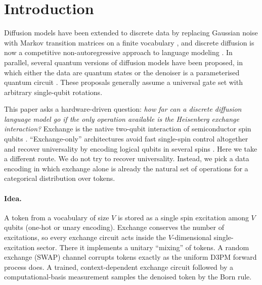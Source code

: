 \section{Introduction}
Diffusion models \citep{sohl2015deep,ho2020denoising} have been extended to discrete data by
replacing Gaussian noise with Markov transition matrices on a finite vocabulary
\citep{austin2021structured,hoogeboom2021argmax}, and discrete diffusion is now a competitive
non-autoregressive approach to language modeling \citep{lou2024discrete,sahoo2024simple}.
In parallel, several quantum versions of diffusion models have been proposed, in which either the data
are quantum states or the denoiser is a parameterised quantum circuit
\citep{zhang2024generative,parigi2023quantum,cacioppo2023quantum,kolle2024quantum}.
These proposals generally assume a universal gate set with arbitrary single-qubit rotations.

This paper asks a hardware-driven question: \emph{how far can a discrete diffusion language model go
if the only operation available is the Heisenberg exchange interaction?} Exchange is the native
two-qubit interaction of semiconductor spin qubits \citep{loss1998quantum,burkard2023semiconductor}.
``Exchange-only'' architectures avoid fast single-spin control altogether and recover universality by
encoding logical qubits in several spins \citep{divincenzo2000universal,weinstein2023universal}.
Here we take a different route. We do not try to recover universality. Instead, we pick a data
encoding in which exchange alone is already the natural set of operations for a categorical
distribution over tokens.

\paragraph{Idea.} A token from a vocabulary of size $V$ is stored as a single spin excitation among
$V$ qubits (one-hot or unary encoding). Exchange conserves the number of excitations, so every exchange
circuit acts inside the $V$-dimensional single-excitation sector. There it implements a unitary
``mixing'' of tokens. A random exchange (SWAP) channel corrupts tokens exactly as the uniform D3PM forward
process does. A trained, context-dependent exchange circuit followed by a computational-basis
measurement samples the denoised token by the Born rule.

